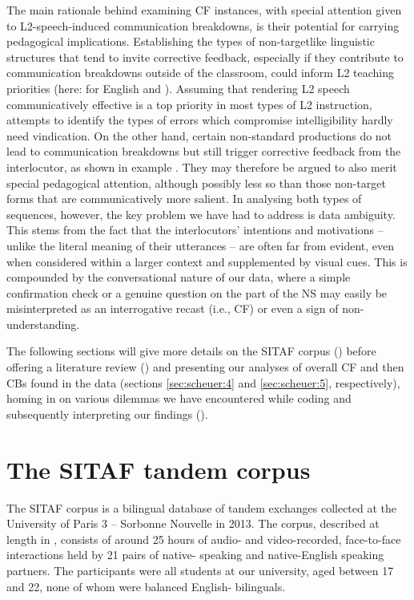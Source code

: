 \documentclass[output=paper,colorlinks,citecolor=brown,modfonts,nonflat]{../langscibook}
\begin{document}
The main rationale behind examining CF instances, with special attention given to L2-speech-induced communication breakdowns, is their potential for carrying pedagogical implications. Establishing the types of non-targetlike linguistic structures that tend to invite corrective feedback, especially if they contribute to communication breakdowns outside of the classroom, could inform L2 teaching priorities (here: for English and ). Assuming that rendering L2 speech communicatively effective is a top priority in most types of L2 instruction, attempts to identify the types of errors which compromise intelligibility hardly need vindication. On the other hand, certain non-standard productions do not lead to communication breakdowns but still trigger corrective feedback from the interlocutor, as shown in example . They may therefore be argued to also merit special pedagogical attention, although possibly less so than those non-target forms that are communicatively more salient. In analysing both types of sequences, however, the key problem we have had to address is data ambiguity. This stems from the fact that the interlocutors’ intentions and motivations – unlike the literal meaning of their utterances – are often far from evident, even when considered within a larger context and supplemented by visual cues. This is compounded by the conversational nature of our data, where a simple confirmation check or a genuine question on the part of the NS may easily be misinterpreted as an interrogative recast (i.e., CF) or even a sign of non-understanding.



The following sections will give more details on the SITAF corpus () before offering a literature review () and presenting our analyses of overall CF and then CBs found in the data (sections \ref{sec:scheuer:4} and \ref{sec:scheuer:5}, respectively), homing in on various dilemmas we have encountered while coding and subsequently interpreting our findings (). 

\section{The SITAF tandem corpus}\label{sec:scheuer:2}

The SITAF corpus is a bilingual database of tandem exchanges collected at the University of Paris 3 – Sorbonne Nouvelle in 2013. The corpus, described at length in \citet{HorguesScheuer2015}, consists of around 25 hours of audio- and video-recorded, face-to-face interactions held by 21 pairs of native- speaking and native-English speaking partners. The participants were all students at our university, aged between 17 and 22, none of whom were balanced English- bilinguals. 
\end{document}
